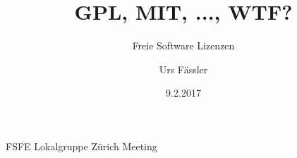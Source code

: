 
\usepackage[utf8x]{inputenc}
\usepackage{ucs}
\usepackage{amsmath}
\usepackage{amsfonts}
\usepackage{amssymb}
\usepackage{graphicx}
\usepackage{appendixnumberbeamer}
\usepackage{url}
\usepackage{makecell}
\usepackage{svgcolor}
\usepackage{tikz}
\usetikzlibrary{arrows, positioning, shapes}
\usetikzlibrary{backgrounds, fit, decorations.pathreplacing, calc}
\usepackage{multicol}

\title{GPL, MIT, ..., WTF?}
\subtitle{Freie Software Lizenzen}
\author{Urs Fässler}
\date{9.2.2017}
\institute
{
	FSFE Lokalgruppe Zürich Meeting
}
\subject{CC-BY-SA Urs Fässler}

\newcommand{\todo}[1]{{\color{red}TODO: #1}}

\newcommand{\hnote}[1]{\only<handout>{\footnote{#1}}}
\newcommand{\hcite}[1]{\only<handout>{\cite{#1}}}

\newcommand*\oldmacro{}%
\let\oldmacro\insertshorttitle%
\renewcommand*\insertshorttitle{%
	\oldmacro\hfill%
	\insertframenumber
}

\beamertemplatenavigationsymbolsempty


\newcommand{\subsectionframe}
{
	\begin{frame}[noframenumbering]
		\begin{center}
			\begin{huge}
				\insertsubsection
			\end{huge}
		\end{center}
	\end{frame}
}

\renewcommand\theadalign{cb}
\renewcommand\theadfont{\bfseries}
\renewcommand\theadgape{\Gape[4pt]}
\renewcommand\cellgape{\Gape[4pt]}




\titlepage






{
	\appendix
	
}


